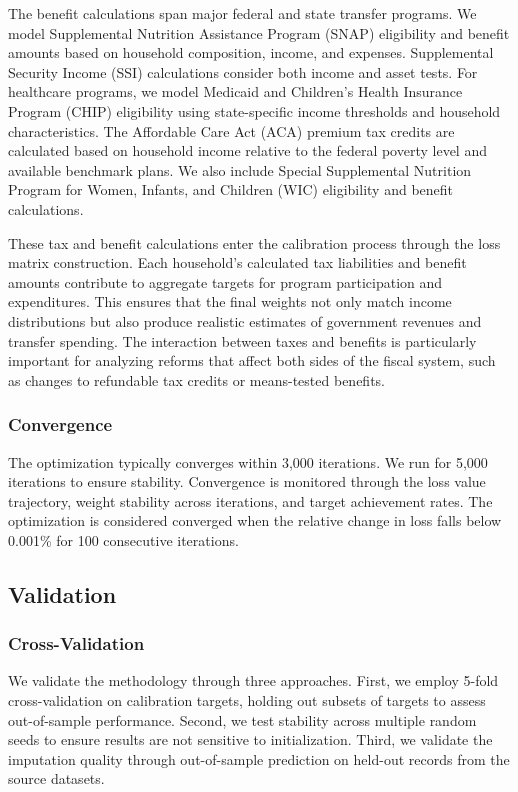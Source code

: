 The benefit calculations span major federal and state transfer programs. We model Supplemental Nutrition Assistance Program (SNAP) eligibility and benefit amounts based on household composition, income, and expenses. Supplemental Security Income (SSI) calculations consider both income and asset tests. For healthcare programs, we model Medicaid and Children's Health Insurance Program (CHIP) eligibility using state-specific income thresholds and household characteristics. The Affordable Care Act (ACA) premium tax credits are calculated based on household income relative to the federal poverty level and available benchmark plans. We also include Special Supplemental Nutrition Program for Women, Infants, and Children (WIC) eligibility and benefit calculations.

These tax and benefit calculations enter the calibration process through the loss matrix construction. Each household's calculated tax liabilities and benefit amounts contribute to aggregate targets for program participation and expenditures. This ensures that the final weights not only match income distributions but also produce realistic estimates of government revenues and transfer spending. The interaction between taxes and benefits is particularly important for analyzing reforms that affect both sides of the fiscal system, such as changes to refundable tax credits or means-tested benefits.

\subsubsection{Convergence}

The optimization typically converges within 3,000 iterations. We run for 5,000 iterations to ensure stability. Convergence is monitored through the loss value trajectory, weight stability across iterations, and target achievement rates. The optimization is considered converged when the relative change in loss falls below 0.001\% for 100 consecutive iterations.

\subsection{Validation}

\subsubsection{Cross-Validation}

We validate the methodology through three approaches. First, we employ 5-fold cross-validation on calibration targets, holding out subsets of targets to assess out-of-sample performance. Second, we test stability across multiple random seeds to ensure results are not sensitive to initialization. Third, we validate the imputation quality through out-of-sample prediction on held-out records from the source datasets.


